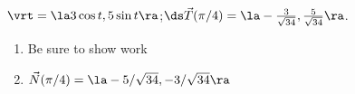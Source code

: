 {$\vrt = \la 3\cos t,5\sin t\ra$;\quad $\ds \vec T(\pi/4) = \la -\frac3{\sqrt{34}}, \frac5{\sqrt{34}}\ra$.
}
{\begin{enumerate}
	\item Be sure to show work
	\item	$\vec N(\pi/4) = \la -5/\sqrt{34}, -3/\sqrt{34}\ra$
\end{enumerate}
}